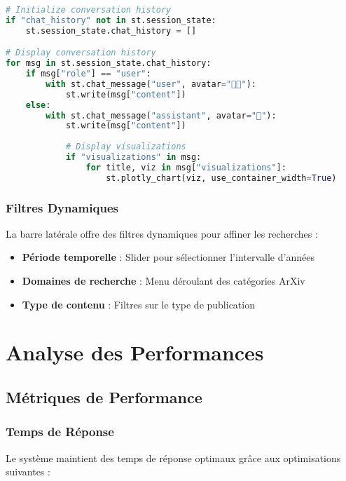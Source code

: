 \documentclass[12pt,a4paper]{article}
\begin{document}
\begin{lstlisting}[language=Python, caption=Gestion de l'interface chat]
# Initialize conversation history
if "chat_history" not in st.session_state:
    st.session_state.chat_history = []

# Display conversation history
for msg in st.session_state.chat_history:
    if msg["role"] == "user":
        with st.chat_message("user", avatar="🧑‍💻"):
            st.write(msg["content"])
    else:
        with st.chat_message("assistant", avatar="🔬"):
            st.write(msg["content"])
            
            # Display visualizations
            if "visualizations" in msg:
                for title, viz in msg["visualizations"]:
                    st.plotly_chart(viz, use_container_width=True)
\end{lstlisting}

\subsubsection{Filtres Dynamiques}

La barre latérale offre des filtres dynamiques pour affiner les recherches :

\begin{itemize}
    \item \textbf{Période temporelle} : Slider pour sélectionner l'intervalle d'années
    \item \textbf{Domaines de recherche} : Menu déroulant des catégories ArXiv
    \item \textbf{Type de contenu} : Filtres sur le type de publication
\end{itemize}

\section{Analyse des Performances}

\subsection{Métriques de Performance}

\subsubsection{Temps de Réponse}

Le système maintient des temps de réponse optimaux grâce aux optimisations suivantes :
\end{document}
